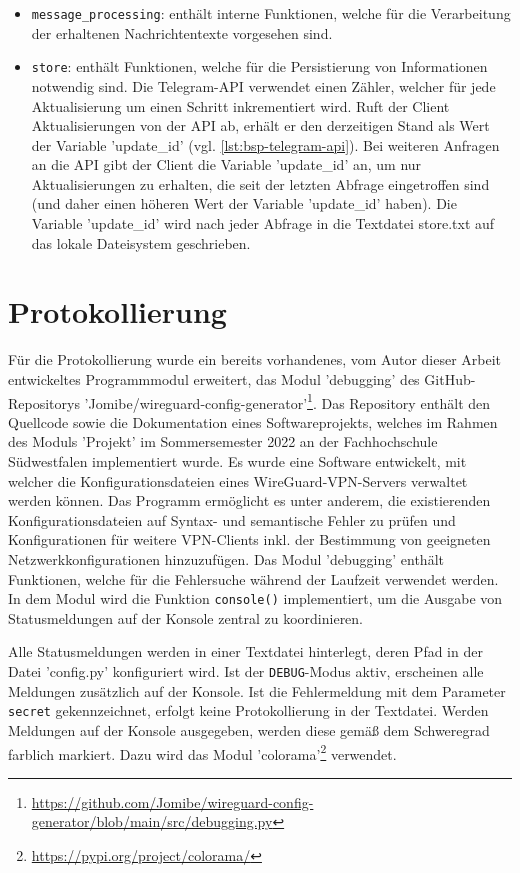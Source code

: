 \begin{itemize}
\item \lstinline{message_processing}: enthält interne Funktionen, welche für die Verarbeitung der erhaltenen Nachrichtentexte vorgesehen sind. 
\item \lstinline{store}: enthält Funktionen, welche für die Persistierung von Informationen notwendig sind. Die Telegram-API verwendet einen Zähler, welcher für jede Aktualisierung um einen Schritt inkrementiert wird. Ruft der Client Aktualisierungen von der API ab, erhält er den derzeitigen Stand als Wert der Variable 'update\_id' (vgl. \autoref{lst:bsp-telegram-api}). Bei weiteren Anfragen an die API gibt der Client die Variable 'update\_id' an, um nur Aktualisierungen zu erhalten, die seit der letzten Abfrage eingetroffen sind (und daher einen höheren Wert der Variable 'update\_id' haben). Die Variable 'update\_id' wird nach jeder Abfrage in die Textdatei store.txt auf das lokale Dateisystem geschrieben.
\end{itemize}

\section{Protokollierung}
\label{sec:protokollierung}

Für die Protokollierung wurde ein bereits vorhandenes, vom Autor dieser Arbeit entwickeltes Programmmodul erweitert, das Modul 'debugging' des GitHub-Repositorys 'Jomibe/wireguard-config-generator'\footnote{\url{https://github.com/Jomibe/wireguard-config-generator/blob/main/src/debugging.py}}. Das Repository enthält den Quellcode sowie die Dokumentation eines Softwareprojekts, welches im Rahmen des Moduls 'Projekt' im Sommersemester 2022 an der Fachhochschule Südwestfalen implementiert wurde. Es wurde eine Software entwickelt, mit welcher die Konfigurationsdateien eines WireGuard-VPN-Servers verwaltet werden können. Das Programm ermöglicht es unter anderem, die existierenden Konfigurationsdateien auf Syntax- und semantische Fehler zu prüfen und Konfigurationen für weitere VPN-Clients inkl. der Bestimmung von geeigneten Netzwerkkonfigurationen hinzuzufügen. Das Modul 'debugging' enthält Funktionen, welche für die Fehlersuche während der Laufzeit verwendet werden. In dem Modul wird die Funktion \lstinline{console()} implementiert, um die Ausgabe von Statusmeldungen auf der Konsole zentral zu koordinieren. 

Alle Statusmeldungen werden in einer Textdatei hinterlegt, deren Pfad in der Datei 'config.py' konfiguriert wird. Ist der \lstinline{DEBUG}-Modus aktiv, erscheinen alle Meldungen zusätzlich auf der Konsole. Ist die Fehlermeldung mit dem Parameter \lstinline{secret} gekennzeichnet, erfolgt keine Protokollierung in der Textdatei. Werden Meldungen auf der Konsole ausgegeben, werden diese gemäß dem Schweregrad farblich markiert. Dazu wird das Modul 'colorama'\footnote{\url{https://pypi.org/project/colorama/}} verwendet.

